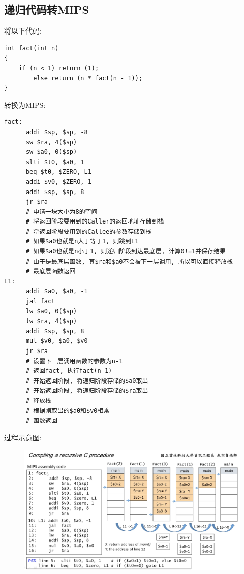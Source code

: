 \subsection{递归代码转MIPS}
将以下代码:
\begin{lstlisting}
int fact(int n)
{
    if (n < 1) return (1);
        else return (n * fact(n - 1));
}
\end{lstlisting}\par
转换为MIPS:
\begin{lstlisting}
fact:
      addi $sp, $sp, -8
      sw $ra, 4($sp)
      sw $a0, 0($sp)
      slti $t0, $a0, 1
      beq $t0, $ZERO, L1
      addi $v0, $ZERO, 1
      addi $sp, $sp, 8
      jr $ra
      # 申请一块大小为8的空间
      # 将返回阶段要用到的Caller的返回地址存储到栈
      # 将返回阶段要用到的Callee的参数存储到栈
      # 如果$a0也就是n大于等于1, 则跳到L1
      # 如果$a0也就是n小于1, 则递归阶段到达最底层, 计算0!=1并保存结果
      # 由于是最底层函数, 其$ra和$a0不会被下一层调用, 所以可以直接释放栈
      # 最底层函数返回
L1:
      addi $a0, $a0, -1
      jal fact
      lw $a0, 0($sp)
      lw $ra, 4($sp)
      addi $sp, $sp, 8
      mul $v0, $a0, $v0
      jr $ra
      # 设置下一层调用函数的参数为n-1
      # 返回fact, 执行fact(n-1)
      # 开始返回阶段, 将递归阶段存储的$a0取出
      # 开始返回阶段, 将递归阶段存储的$ra取出
      # 释放栈
      # 根据刚取出的$a0和$v0相乘
      # 函数返回
\end{lstlisting}\par 
过程示意图:
\begin{figure}[H]
\centering
\includegraphics[scale=.5]{img/figure2.png}
\end{figure}
